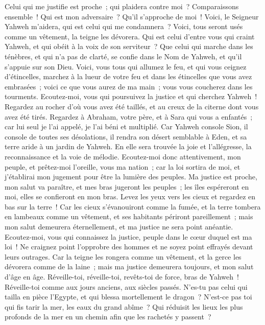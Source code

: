 \begin{multicols}{2}
Celui qui me justifie est proche~; qui plaidera contre moi~? Comparaissons ensemble~! Qui est mon adversaire~? Qu'il s'approche de moi~!
Voici, le Seigneur Yahweh m'aidera, qui est celui qui me condamnera~? Voici, tous seront usés comme un vêtement, la teigne les dévorera.
Qui est celui d'entre vous qui craint Yahweh, et qui obéit à la voix de son serviteur~? Que celui qui marche dans les ténèbres, et qui n'a pas de clarté, se confie dans le Nom de Yahweh, et qu'il s'appuie sur son Dieu.
Voici, vous tous qui allumez le feu, et qui vous ceignez d'étincelles, marchez à la lueur de votre feu et dans les étincelles que vous avez embrasées~; voici ce que vous aurez de ma main~; vous vous coucherez dans les tourments.
\VerseOne{}Ecoutez-moi, vous qui poursuivez la justice et qui cherchez Yahweh~! Regardez au rocher d'où vous avez été taillés, et au creux de la citerne dont vous avez été tirés.
Regardez à Abraham, votre père, et à Sara qui vous a enfantés~; car lui seul je l'ai appelé, je l'ai béni et multiplié.
Car Yahweh console Sion, il console de toutes ses désolations, il rendra son désert semblable à Eden, et sa terre aride à un jardin de Yahweh. En elle sera trouvée la joie et l'allégresse, la reconnaissance et la voie de mélodie.
Ecoutez-moi donc attentivement, mon peuple, et prêtez-moi l'oreille, vous ma nation~; car la loi sortira de moi, et j'établirai mon jugement pour être la lumière des peuples.
Ma justice est proche, mon salut va paraître, et mes bras jugeront les peuples~; les îles espéreront en moi, elles se confieront en mon bras.
Levez les yeux vers les cieux et regardez en bas sur la terre~! Car les cieux s'évanouiront comme la fumée, et la terre tombera en lambeaux comme un vêtement, et ses habitants périront pareillement~; mais mon salut demeurera éternellement, et ma justice ne sera point anéantie.
Ecoutez-moi, vous qui connaissez la justice, peuple dans le cœur duquel est ma loi~! Ne craignez point l'opprobre des hommes et ne soyez point effrayés devant leurs outrages.
Car la teigne les rongera comme un vêtement, et la gerce les dévorera comme de la laine~; mais ma justice demeurera toujours, et mon salut d'âge en âge.
Réveille-toi, réveille-toi, revêts-toi de force, bras de Yahweh~! Réveille-toi comme aux jours anciens, aux siècles passés. N'es-tu pas celui qui tailla en pièce l'Egypte, et qui blessa mortellement le dragon~?
N'est-ce pas toi qui fis tarir la mer, les eaux du grand abîme~? Qui réduisit les lieux les plus profonds de la mer en un chemin afin que les rachetés y passent~?

\end{multicols}
